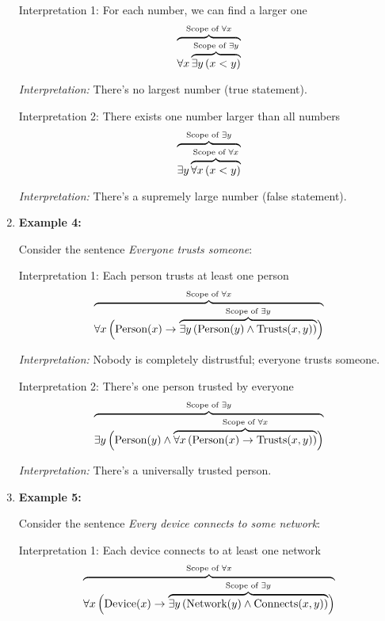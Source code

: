 \documentclass[12pt,a4paper,openany]{article}
\begin{document}
\begin{enumerate}
  Interpretation 1: For each number, we can find a larger one \[
   {\color{black}\overbrace{\color{black}\forall x \,
   {\color{black}\overbrace{\color{black}\exists y \, (x < y)}^{\color{black}\text{Scope of } \exists y}} 
   }^{\color{black}\text{Scope of } \forall x}}
   \]

  \emph{Interpretation:} There's no largest number (true statement).

  Interpretation 2: There exists one number larger than all numbers \[
   {\color{black}\overbrace{\color{black}\exists y \,
   {\color{black}\overbrace{\color{black}\forall x \, (x < y)}^{\color{black}\text{Scope of } \forall x}}
   }^{\color{black}\text{Scope of } \exists y}}
   \]

  \emph{Interpretation:} There's a supremely large number (false
  statement).
\item
  \textbf{Example 4:}

  Consider the sentence \emph{Everyone trusts someone}:

  Interpretation 1: Each person trusts at least one person \[
   {\color{black}\overbrace{\color{black}\forall x \, \Big(
   \text{Person}(x) \rightarrow
   {\color{black}\overbrace{\color{black}\exists y \, (\text{Person}(y) \wedge \text{Trusts}(x,y))}^{\color{black}\text{Scope of } \exists y}}
   \Big)}^{\color{black}\text{Scope of } \forall x}}
   \]

  \emph{Interpretation:} Nobody is completely distrustful; everyone
  trusts someone.

  Interpretation 2: There's one person trusted by everyone \[
   {\color{black}\overbrace{\color{black}\exists y \,
   \Big(
   \text{Person}(y) \wedge
   {\color{black}\overbrace{\color{black}\forall x \, 
   ( \text{Person}(x) \rightarrow \text{Trusts}(x,y) )
   }^{\color{black}\text{Scope of } \forall x}}
   \Big)
   }^{\color{black}\text{Scope of } \exists y}}
   \]

  \emph{Interpretation:} There's a universally trusted person.
\item
  \textbf{Example 5:}

  Consider the sentence \emph{Every device connects to some network}:

  Interpretation 1: Each device connects to at least one network \[
   {\color{black}\overbrace{\color{black}\forall x \, \Big(
   \text{Device}(x) \rightarrow
   {\color{black}\overbrace{\color{black}\exists y \, (\text{Network}(y) \wedge \text{Connects}(x,y))}^{\color{black}\text{Scope of } \exists y}}
   \Big)}^{\color{black}\text{Scope of } \forall x}}
   \]


\end{enumerate}
\end{document}

